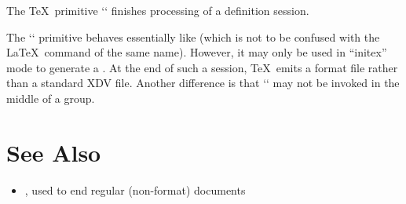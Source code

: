 
The \TeX\ primitive \tex`\dump` finishes processing of a  definition
session.

The \tex`\dump` primitive behaves essentially like  (which is not to be
confused with the \LaTeX\ command of the same name). However, it may only be
used in “initex” mode to generate a . At the end of such a session,
\TeX\ emits a format file rather than a standard XDV file. Another difference is
that \tex`\dump` may not be invoked in the middle of a group.

\section*{See Also}

\begin{itemize}
\item {}, used to end regular (non-format) documents
\end{itemize}
